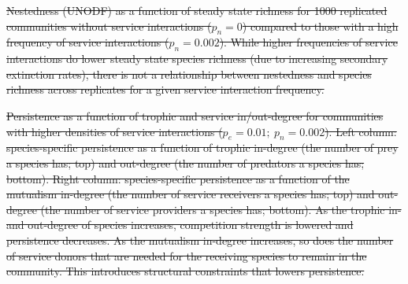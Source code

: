 \documentclass[twocolumn,preprintnumbers,amsmath,amssymb,superscriptaddress,linenumbers]{revtex4-1}
\providecommand{\DIFdel}[1]{{\protect\color{red}\sout{#1}}}                      %
\providecommand{\DIFdelFL}[1]{\DIFdel{#1}} %
\begin{document}
{%
\DIFdelFL{Nestedness (UNODF) as a function of steady state richness for 1000 replicated communities without service interactions ($p_n = 0$) compared to those with a high frequency of service interactions ($p_n = 0.002$).
While higher frequencies of service interactions do lower steady state species richness (due to increasing secondary extinction rates), there is not a relationship between nestedness and species richness across replicates for a given service interaction frequency.
}}

{%
\DIFdelFL{Persistence as a function of trophic and service in/out-degree for communities with higher densities of service interactions ($p_e = 0.01;~p_n = 0.002$).
Left column: species-specific persistence as a function of trophic in-degree (the number of prey a species has; top) and out-degree (the number of predators a species has; bottom).
Right column: species-specific persistence as a function of the mutualism in-degree (the number of service receivers a species has; top) and out-degree (the number of service providers a species has; bottom).
As the trophic in- and out-degree of species increases, competition strength is lowered and persistence decreases.
As the mutualism in-degree increases, so does the number of service donors that are needed for the receiving species to remain in the community. This introduces structural constraints that lowers persistence.
}}
\end{document}
